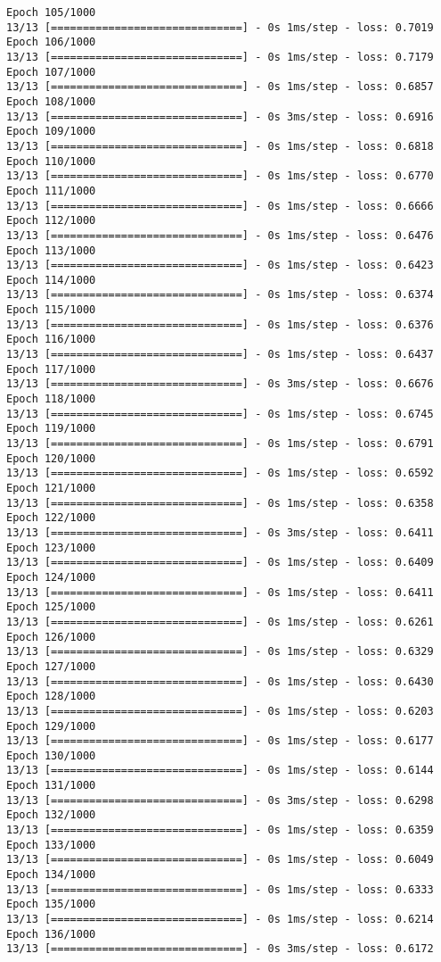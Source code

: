 \documentclass[11pt]{article}
\begin{document}
\begin{Verbatim}[commandchars=\\\{\}]
Epoch 105/1000
13/13 [==============================] - 0s 1ms/step - loss: 0.7019
Epoch 106/1000
13/13 [==============================] - 0s 1ms/step - loss: 0.7179
Epoch 107/1000
13/13 [==============================] - 0s 1ms/step - loss: 0.6857
Epoch 108/1000
13/13 [==============================] - 0s 3ms/step - loss: 0.6916
Epoch 109/1000
13/13 [==============================] - 0s 1ms/step - loss: 0.6818
Epoch 110/1000
13/13 [==============================] - 0s 1ms/step - loss: 0.6770
Epoch 111/1000
13/13 [==============================] - 0s 1ms/step - loss: 0.6666
Epoch 112/1000
13/13 [==============================] - 0s 1ms/step - loss: 0.6476
Epoch 113/1000
13/13 [==============================] - 0s 1ms/step - loss: 0.6423
Epoch 114/1000
13/13 [==============================] - 0s 1ms/step - loss: 0.6374
Epoch 115/1000
13/13 [==============================] - 0s 1ms/step - loss: 0.6376
Epoch 116/1000
13/13 [==============================] - 0s 1ms/step - loss: 0.6437
Epoch 117/1000
13/13 [==============================] - 0s 3ms/step - loss: 0.6676
Epoch 118/1000
13/13 [==============================] - 0s 1ms/step - loss: 0.6745
Epoch 119/1000
13/13 [==============================] - 0s 1ms/step - loss: 0.6791
Epoch 120/1000
13/13 [==============================] - 0s 1ms/step - loss: 0.6592
Epoch 121/1000
13/13 [==============================] - 0s 1ms/step - loss: 0.6358
Epoch 122/1000
13/13 [==============================] - 0s 3ms/step - loss: 0.6411
Epoch 123/1000
13/13 [==============================] - 0s 1ms/step - loss: 0.6409
Epoch 124/1000
13/13 [==============================] - 0s 1ms/step - loss: 0.6411
Epoch 125/1000
13/13 [==============================] - 0s 1ms/step - loss: 0.6261
Epoch 126/1000
13/13 [==============================] - 0s 1ms/step - loss: 0.6329
Epoch 127/1000
13/13 [==============================] - 0s 1ms/step - loss: 0.6430
Epoch 128/1000
13/13 [==============================] - 0s 1ms/step - loss: 0.6203
Epoch 129/1000
13/13 [==============================] - 0s 1ms/step - loss: 0.6177
Epoch 130/1000
13/13 [==============================] - 0s 1ms/step - loss: 0.6144
Epoch 131/1000
13/13 [==============================] - 0s 3ms/step - loss: 0.6298
Epoch 132/1000
13/13 [==============================] - 0s 1ms/step - loss: 0.6359
Epoch 133/1000
13/13 [==============================] - 0s 1ms/step - loss: 0.6049
Epoch 134/1000
13/13 [==============================] - 0s 1ms/step - loss: 0.6333
Epoch 135/1000
13/13 [==============================] - 0s 1ms/step - loss: 0.6214
Epoch 136/1000
13/13 [==============================] - 0s 3ms/step - loss: 0.6172

\end{Verbatim}
\end{document}
